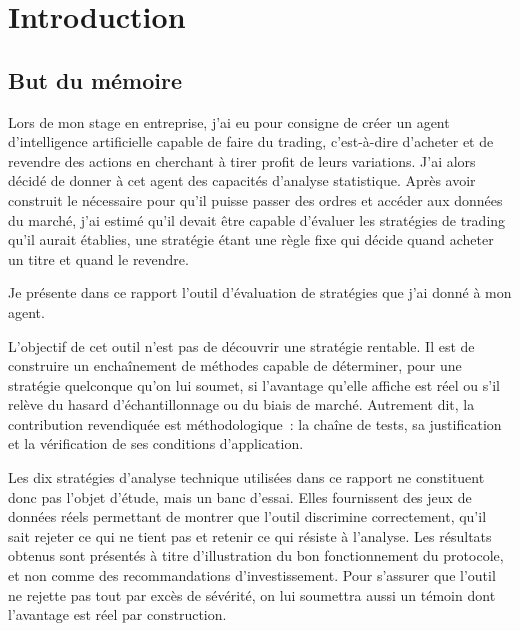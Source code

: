 \chapter{Introduction}
\label{chap:intro}

\section{But du mémoire}
\label{sec:but}

Lors de mon stage en entreprise, j'ai eu pour consigne de créer un agent
d'intelligence artificielle capable de faire du trading, c'est-à-dire
d'acheter et de revendre des actions en cherchant à tirer profit de leurs
variations. J'ai alors décidé de donner à cet agent des capacités
d'analyse statistique. Après avoir construit le nécessaire pour qu'il
puisse passer des ordres et accéder aux données du marché, j'ai estimé
qu'il devait être capable d'évaluer les stratégies de trading qu'il
aurait établies, une stratégie étant une règle fixe qui décide quand
acheter un titre et quand le revendre.

Je présente dans ce rapport l'outil d'évaluation de stratégies que j'ai
donné à mon agent.

L'objectif de cet outil n'est pas de découvrir une stratégie rentable.
Il est de construire un enchaînement de méthodes capable de déterminer,
pour une stratégie quelconque qu'on lui soumet, si l'avantage qu'elle
affiche est réel ou s'il relève du hasard d'échantillonnage ou du biais
de marché. Autrement dit, la contribution revendiquée est
méthodologique~: la chaîne de tests, sa justification et la vérification
de ses conditions d'application.

Les dix stratégies d'analyse technique utilisées dans ce rapport ne
constituent donc pas l'objet d'étude, mais un banc d'essai. Elles
fournissent des jeux de données réels permettant de montrer que l'outil
discrimine correctement, qu'il sait rejeter ce qui ne tient pas et
retenir ce qui résiste à l'analyse. Les résultats obtenus sont présentés
à titre d'illustration du bon fonctionnement du protocole, et non comme
des recommandations d'investissement. Pour s'assurer que l'outil ne
rejette pas tout par excès de sévérité, on lui soumettra aussi un témoin
dont l'avantage est réel par construction.

